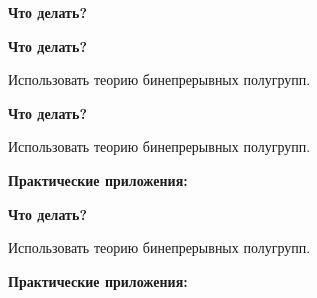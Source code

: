\documentclass[11pt]{article}
\begin{document}
\newpage

\begin{center}
{\color{notaeYELLOW}\bfseries\fontsize{44}{52}\selectfont Что делать?}
\end{center}
\vspace*{\fill}
\begin{center}
\fontsize{36}{43}\selectfont
\end{center}
\vspace*{\fill}

\newpage

\begin{center}
{\color{notaeYELLOW}\bfseries\fontsize{44}{52}\selectfont Что делать?}
\end{center}
\vspace*{\fill}
\begin{center}
\fontsize{36}{43}\selectfont
\parbox{\linewidth}{\centering\noindent Использовать теорию бинепрерывных полугрупп.
\par}\vspace{0.4in}
\end{center}
\vspace*{\fill}

\newpage

\begin{center}
{\color{notaeYELLOW}\bfseries\fontsize{44}{52}\selectfont Что делать?}
\end{center}
\vspace*{\fill}
\begin{center}
\fontsize{36}{43}\selectfont
\parbox{\linewidth}{\centering\noindent Использовать теорию бинепрерывных полугрупп.
\par}\vspace{0.4in}
\parbox{\linewidth}{\centering\noindent \textbf{Практические приложения:}
\par}\vspace{0.4in}
\end{center}
\vspace*{\fill}

\newpage

\begin{center}
{\color{notaeYELLOW}\bfseries\fontsize{44}{52}\selectfont Что делать?}
\end{center}
\vspace*{\fill}
\begin{center}
\fontsize{36}{43}\selectfont
\parbox{\linewidth}{\centering\noindent Использовать теорию бинепрерывных полугрупп.
\par}\vspace{0.4in}
\parbox{\linewidth}{\centering\noindent \textbf{Практические приложения:}
\par}\vspace{0.4in}
\parbox{\linewidth}{\centering{}
\par}\vspace{0.4in}
\end{center}
\vspace*{\fill}
\end{document}
